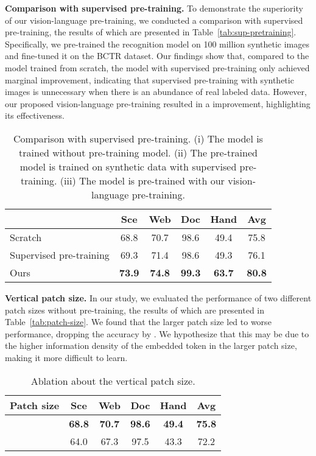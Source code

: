 \vspace{2mm}
\noindent\textbf{Comparison with supervised pre-training.} To demonstrate the superiority of our vision-language pre-training, we conducted a comparison with supervised pre-training, the results of which are presented in Table~\ref{tab:sup-pretraining}. Specifically, we pre-trained the recognition model on 100 million synthetic images and fine-tuned it on the BCTR dataset. Our findings show that, compared to the model trained from scratch, the model with supervised pre-training only achieved marginal improvement, indicating that supervised pre-training with synthetic images is unnecessary when there is an abundance of real labeled data. However, our proposed vision-language pre-training resulted in a  improvement, highlighting its effectiveness.


\begin{table}
    \caption{Comparison with supervised pre-training. (i) The model is trained without pre-training model. (ii) The pre-trained model is trained on synthetic data with supervised pre-training. (iii) The model is pre-trained with our vision-language pre-training. }
    \label{tab:sup-pretraining}
    \setlength{\tabcolsep}{4.5pt}
    \centering
    \begin{tabular}{lccccc}
    \toprule
    &Sce &Web &Doc &Hand &Avg\\
    \midrule
    Scratch  &68.8 &70.7 &98.6 &49.4 &75.8 \\
    Supervised pre-training  &69.3 &71.4 &98.6 &49.3 &76.1 \\
    Ours   &\textbf{73.9} &\textbf{74.8} &\textbf{99.3} &\textbf{63.7} &\textbf{80.8} \\
    \bottomrule
    \end{tabular}
  \label{tab:tabe}
\end{table}

\vspace{2mm}
\noindent\textbf{Vertical patch size.} In our study, we evaluated the performance of two different patch sizes without pre-training, the results of which are presented in Table~\ref{tab:patch-size}. We found that the larger patch size led to worse performance, dropping the accuracy by . We hypothesize that this may be due to the higher information density of the embedded token in the larger patch size, making it more difficult to learn.


\begin{table}[h]
    \caption{Ablation 
    about the vertical patch size.}
    \label{tab:patch-size}
    \setlength{\tabcolsep}{9pt}
    \centering
    \begin{tabular}{lccccc}
    \toprule
    {Patch size}
    &Sce &Web &Doc &Hand &Avg\\
    \midrule
      &\textbf{68.8} &\textbf{70.7} &\textbf{98.6} &\textbf{49.4} &\textbf{75.8} \\
      &64.0 &67.3 &97.5 &43.3 &72.2 \\
    \bottomrule
    \end{tabular}
  \label{tab:tabe}
\end{table}


